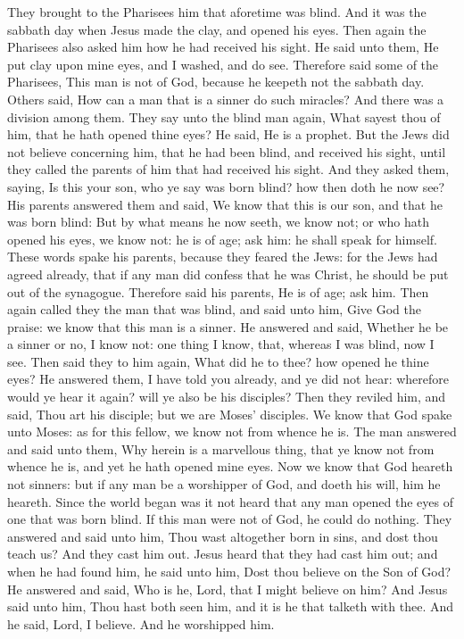  They brought to the Pharisees him that aforetime was
blind.  And it was the sabbath day when Jesus made the
clay, and opened his eyes.  Then again the Pharisees also
asked him how he had received his sight. He said unto them, He put clay
upon mine eyes, and I washed, and do see.  Therefore said
some of the Pharisees, This man is not of God, because he keepeth not
the sabbath day. Others said, How can a man that is a sinner do such
miracles? And there was a division among them.  They say
unto the blind man again, What sayest thou of him, that he hath opened
thine eyes? He said, He is a prophet.  But the Jews did
not believe concerning him, that he had been blind, and received his
sight, until they called the parents of him that had received his sight.
 And they asked them, saying, Is this your son, who ye
say was born blind? how then doth he now see?  His
parents answered them and said, We know that this is our son, and that
he was born blind:  But by what means he now seeth, we
know not; or who hath opened his eyes, we know not: he is of age; ask
him: he shall speak for himself.  These words spake his
parents, because they feared the Jews: for the Jews had agreed already,
that if any man did confess that he was Christ, he should be put out of
the synagogue.  Therefore said his parents, He is of age;
ask him.  Then again called they the man that was blind,
and said unto him, Give God the praise: we know that this man is a
sinner.  He answered and said, Whether he be a sinner or
no, I know not: one thing I know, that, whereas I was blind, now I see.
 Then said they to him again, What did he to thee? how
opened he thine eyes?  He answered them, I have told you
already, and ye did not hear: wherefore would ye hear it again? will ye
also be his disciples?  Then they reviled him, and said,
Thou art his disciple; but we are Moses' disciples.  We
know that God spake unto Moses: as for this fellow, we know not from
whence he is.  The man answered and said unto them, Why
herein is a marvellous thing, that ye know not from whence he is, and
yet he hath opened mine eyes.  Now we know that God
heareth not sinners: but if any man be a worshipper of God, and doeth
his will, him he heareth.  Since the world began was it
not heard that any man opened the eyes of one that was born blind.
 If this man were not of God, he could do nothing.
 They answered and said unto him, Thou wast altogether
born in sins, and dost thou teach us? And they cast him out.
 Jesus heard that they had cast him out; and when he had
found him, he said unto him, Dost thou believe on the Son of God?
 He answered and said, Who is he, Lord, that I might
believe on him?  And Jesus said unto him, Thou hast both
seen him, and it is he that talketh with thee.  And he
said, Lord, I believe. And he worshipped him.

